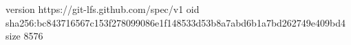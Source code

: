 version https://git-lfs.github.com/spec/v1
oid sha256:bc843716567c153f278099086e1f148533d53b8a7abd6b1a7bd262749e409bd4
size 8576
